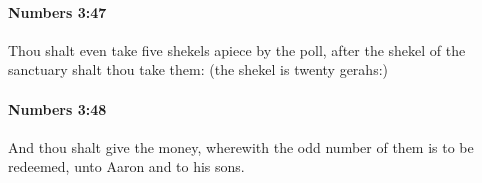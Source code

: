 		\paragraph{Numbers 3:47} %
			\label{NUMBERS-3-47}

			Thou shalt even take five shekels apiece by the poll, after the shekel of the sanctuary shalt thou take them: (the shekel is twenty gerahs:)


		\paragraph{Numbers 3:48} %
			\label{NUMBERS-3-48}

			And thou shalt give the money, wherewith the odd number of them is to be redeemed, unto Aaron and to his sons.


